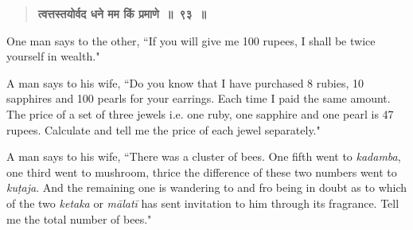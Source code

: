 \documentclass[]{article}
\begin{document}
{\begin{quote}
{{\textbf{{\color{red}त्वत्तस्तयोर्वद धने मम किं प्रमाणे~॥~९३~॥} }}
}  \end{quote}

{One man says to the other, ``If you will give me 100 rupees, I shall be
twice yourself in wealth."\\
}
\newpage
\large


\begin{quote}  {
}  \end{quote}

{A man says to his wife, ``Do you know that I have purchased 8 rubies,
10 sapphires and 100 pearls for your earrings. Each time I paid the same
amount. The price of a set of three jewels i.e. one ruby, one sapphire
and one pearl is 47 rupees. Calculate and tell me the price of each
jewel separately."}

\begin{quote}  {
}  \end{quote}

{A man says to his wife, ``There was a cluster of bees. One fifth went
to \textit{kadamba}, one third went to mushroom, thrice the difference of these
two numbers went to \textit{kuṭaja}. And the remaining one is wandering to and fro
being in doubt as to which of the two \textit{ketaka} or \textit{mālatī} has sent
invitation to him through its fragrance. Tell me the total number of
bees."}

\begin{quote}  {
}  \end{quote}

}
\end{document}

